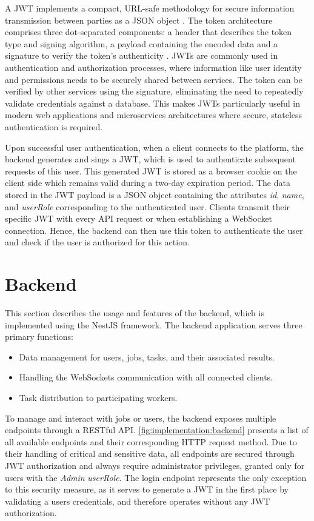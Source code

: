 A \ac{JWT} implements a compact, \acs{URL}-safe methodology for secure information transmission between parties as a \ac{JSON} object \cite{implementation:jwt}. The token architecture comprises three dot-separated components: a header that describes the token type and signing algorithm, a payload containing the encoded data and a signature to verify the token's authenticity \cite{implementation:jwt}. \ac{JWT}s are commonly used in authentication and authorization processes, where information like user identity and permissions needs to be securely shared between services. The token can be verified by other services using the signature, eliminating the need to repeatedly validate credentials against a database. This makes \ac{JWT}s particularly useful in modern web applications and microservices architectures where secure, stateless authentication is required. \cite{implementation:jwt}

Upon successful user authentication, when a client connects to the platform, the backend generates and sings a \ac{JWT}, which is used to authenticate subsequent requests of this user. This generated \ac{JWT} is stored as a browser cookie on the client side which remains valid during a two-day expiration period. The data stored in the \ac{JWT} payload is a \ac{JSON} object containing the attributes \emph{id}, \emph{name}, and \emph{userRole} corresponding to the authenticated user. Clients transmit their specific \ac{JWT} with every \ac{API} request or when establishing a WebSocket connection. Hence, the backend can then use this token to authenticate the user and check if the user is authorized for this action.

\section{Backend}
\label{sec:implementation:backend}
This section describes the usage and features of the backend, which is implemented using the NestJS \cite{methodology:nestjs} framework. The backend application serves three primary functions: 
\begin{itemize}
    \item Data management for users, jobs, tasks, and their associated results.
    \item Handling the WebSockets communication with all connected clients.
    \item Task distribution to participating workers.
\end{itemize}
To manage and interact with jobs or users, the backend exposes multiple endpoints through a \acs{REST}ful \ac{API}. \autoref{fig:implementation:backend} presents a list of all available endpoints and their corresponding \acs{HTTP} request method. Due to their handling of critical and sensitive data, all endpoints are secured through \ac{JWT} authorization and always require administrator privileges, granted only for users with the \emph{Admin} \emph{userRole}. The login endpoint represents the only exception to this security measure, as it serves to generate a \ac{JWT} in the first place by validating a users credentials, and therefore operates without any \ac{JWT} authorization.

